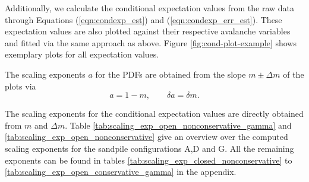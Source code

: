 \begin{table}[!ht]
  \centering
  
  \caption{Scaling exponents of the probability density functions for the open-boundary, nonconservative sandpile configurations (A, D, G). The exponents $\alpha$, $\tau$, and $\lambda$ are obtained from weighted linear least-squares fits on double-logarithmic PDF plots in the selected scaling window; uncertainties are taken from the fit error.}
  \label{tab:scaling_exp_open_nonconservative}
\end{table}


\begin{table}[!ht]
  \centering
  
  \caption{Conditional scaling exponents for the open-boundary, nonconservative sandpile configurations (A, D, G). The exponents $\gamma_1$, $\gamma_2$, and $\gamma_3$ (and their inverse fits) are obtained from weighted linear least-squares fits of conditional expectation values on double-logarithmic plots in the selected scaling window; uncertainties are taken from the fit error.}
  \label{tab:scaling_exp_open_nonconservative_gamma}
\end{table}


Additionally, we calculate the conditional expectation values from the raw data through Equations (\ref{eqn:condexp_est}) and (\ref{eqn:condexp_err_est}). These expectation values are also plotted against their respective avalanche variables and fitted via the same approach as above. Figure \ref{fig:cond-plot-example} shows exemplary plots for all expectation values.


The scaling exponents $a$ for the PDFs are obtained from the slope $m\pm\Delta m$ of the plots via
\begin{equation}
  a = 1-m, \qquad \delta a = \delta m.
\end{equation}





The scaling exponents for the conditional expectation values are directly obtained from $m$ and $\Delta m$. Table \ref{tab:scaling_exp_open_nonconservative_gamma} and \ref{tab:scaling_exp_open_nonconservative} give an overview over the computed scaling exponents for the sandpile configurations A,D and G. All the remaining exponents can be found in tables \ref{tab:scaling_exp_closed_nonconservative} to \ref{tab:scaling_exp_open_conservative_gamma} in the appendix.
